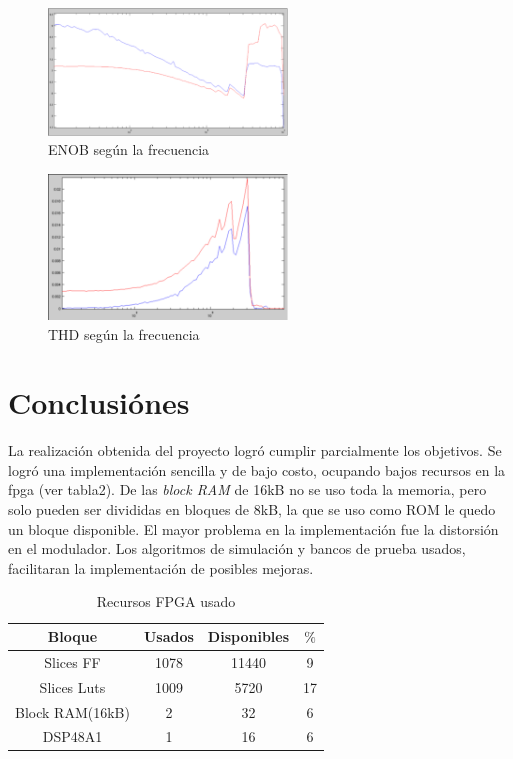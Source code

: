 \documentclass[a4paper,conference]{IEEEtran}
\begin{document}
\begin{figure}[!t]
\centering
\includegraphics[width=2.5in]{Medicion_ENOB}
\caption{ENOB seg\'un la frecuencia}
\label{fig_13}
\end{figure}

\begin{figure}[!t]
\centering
\includegraphics[width=2.5in]{Medicion_THD}
\caption{THD seg\'un la frecuencia}
\label{fig_14}
\end{figure}

\section{Conclusi\'ones}
La realización obtenida del proyecto logr\'o cumplir parcialmente los objetivos. Se logr\'o una implementaci\'on sencilla y de bajo costo, ocupando bajos recursos en la fpga (ver tabla2). De las \textit{block RAM} de 16kB no se uso toda la memoria, pero solo pueden ser divididas en bloques de 8kB, la que se uso como ROM le quedo un bloque disponible. El mayor problema en la implementaci\'on fue la distorsi\'on en el modulador. Los algoritmos de simulaci\'on y bancos de prueba usados, facilitaran la implementaci\'on de posibles mejoras.
\begin{table}
\renewcommand{\arraystretch}{1.3}
\caption{Recursos FPGA usado}
\label{Tabla_2}
\centering
\begin{tabular}{|c|c|c|c|}
\hline
Bloque & Usados & Disponibles & $\%$ \\
\hline
Slices FF & 1078 & 11440 & 9\\
\hline
Slices Luts & 1009 & 5720 & 17\\
\hline
Block RAM(16kB) & 2 & 32 & 6\\
\hline
DSP48A1 & 1 & 16 & 6\\
\hline
\end{tabular}
\end{table}
\end{document}
